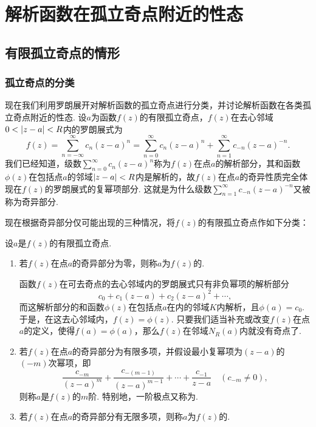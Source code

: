 \section{解析函数在孤立奇点附近的性态}
\subsection{有限孤立奇点的情形}
\subsubsection{孤立奇点的分类}
现在我们利用罗朗展开对解析函数的孤立奇点进行分类，并讨论解析函数在各类孤立奇点附近的性态.
设\(a\)为函数\(f(z)\)的有限孤立奇点，\(f(z)\)在去心邻域\(0<\abs{z-a}<R\)内的罗朗展式为\[
f(z) = \sum_{n=-\infty}^\infty c_n (z-a)^n
= \sum_{n=0}^\infty c_n (z-a)^n
+ \sum_{n=1}^\infty c_{-n} (z-a)^{-n}.
\]我们已经知道，级数\(\sum_{n=0}^\infty c_n (z-a)^n\)称为\(f(z)\)在点\(a\)的解析部分，其和函数\(\phi(z)\)在包括点\(a\)的邻域\(\abs{z-a}<R\)内是解析的，故\(f(z)\)在点\(a\)的奇异性质完全体现在\(f(z)\)的罗朗展式的复幂项部分.
这就是为什么级数\(\sum_{n=1}^\infty c_{-n} (z-a)^{-n}\)又被称为奇异部分.

现在根据奇异部分仅可能出现的三种情况，将\(f(z)\)的有限孤立奇点作如下分类：
\begin{definition}
设\(a\)是\(f(z)\)的有限孤立奇点.
\begin{enumerate}
\item 若\(f(z)\)在点\(a\)的奇异部分为零，则称\(a\)为\(f(z)\)的.

{\footnotesize
函数\(f(z)\)在可去奇点的去心邻域内的罗朗展式只有非负幂项的解析部分\[
c_0 + c_1 (z-a) + c_2 (z-a)^2 + \dotsb,
\]而这解析部分的和函数\(\phi(z)\)在包括点\(a\)在内的邻域\(K\)内解析，且\(\phi(a) = c_0\).
于是，在这去心邻域内，\(f(z) = \phi(z)\).
只要我们适当补充或改变\(f(z)\)在点\(a\)的定义，使得\(f(a) = \phi(a)\)，那么\(f(z)\)在邻域\(N_R(a)\)内就没有奇点了.
}

\item 若\(f(z)\)在点\(a\)的奇异部分为有限多项，并假设最小复幂项为\((z-a)\)的\((-m)\)次幂项，即\[
\frac{c_{-m}}{(z-a)^m} + \frac{c_{-(m-1)}}{(z-a)^{m-1}} + \dotsb + \frac{c_{-1}}{z-a}
\quad(c_{-m}\neq0),
\]则称\(a\)是\(f(z)\)的\(m\)阶.
特别地，一阶极点又称为.

\item 若\(f(z)\)在点\(a\)的奇异部分有无限多项，则称\(a\)为\(f(z)\)的.
\end{enumerate}
\end{definition}

